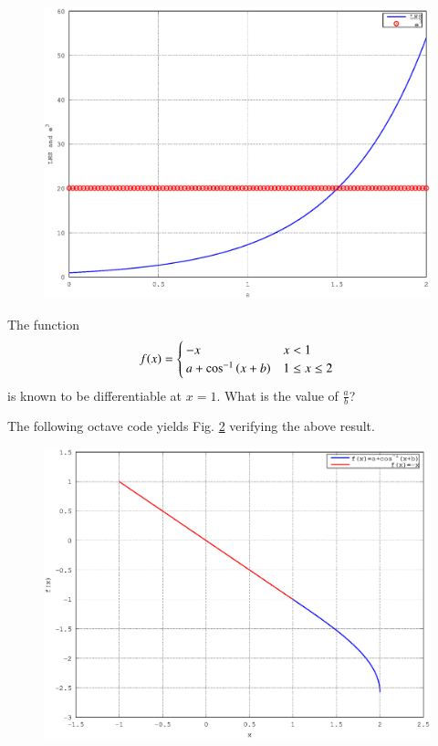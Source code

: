 \documentclass[journal,12pt,twocolumn]{IEEEtran}
\begin{document}
\begin{figure}[!ht]
\begin{center}
\includegraphics[width=\columnwidth]{./version_2/ee16b1004/ee16b1004}
\end{center}
\label{fig_4}	
\end{figure}
\begin{problem}
The function
%
\begin{equation}
f(x)=
\begin{cases}
-x & x < 1 \\
a + \cos^{-1}\left(x + b\right) & 1 \leq x \leq 2
\end{cases}
\end{equation}
%
is known to be differentiable at $x=1$.  What is the value of $\frac{a}{b}$?
\end{problem}
\solution

The following octave code yields Fig. \ref{fig_5} verifying the above result.

\begin{figure}[!ht]
\begin{center}
\includegraphics[width=\columnwidth]{./version_2/ee16b1005/ee16b1005}
\end{center}
\label{fig_5}	
\end{figure}
\end{document}
